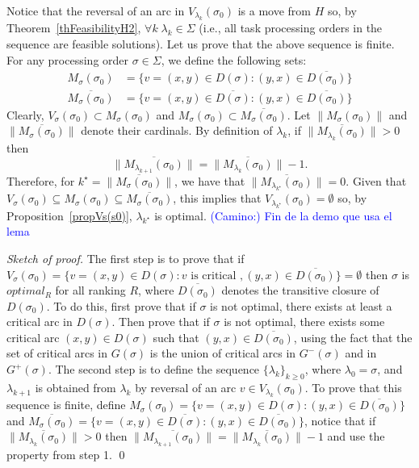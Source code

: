 \documentclass[preprint]{elsarticle}
\newcommand{\textcam}[1]{\textcolor{blue}{(Camino:) #1}}
\begin{document}
Notice that the reversal of an arc in $V_{\lambda_k}(\sigma_0)$ is a move from $H$ so, by Theorem~\ref{thFeasibilityH2}, $\forall k \; \lambda_k \in \Sigma$ (i.e., all task processing orders in the sequence are feasible solutions). Let us prove that the above sequence is finite. For any processing order $\sigma \in \Sigma$, we define the following sets:
\begin{align*}
M_{\sigma}(\sigma_0) & = \{v=(x,y) \in D(\sigma) : (y,x) \in \overline{D(\sigma_0)} \}\\
\overline{M_{\sigma}(\sigma_0)} & = \{v=(x,y) \in \overline{D(\sigma)} : (y,x) \in \overline{D(\sigma_0)} \}
\end{align*}
Clearly, $V_\sigma(\sigma_0) \subset M_\sigma(\sigma_0)$ and $M_\sigma(\sigma_0) \subset \overline{M_\sigma(\sigma_0)}$. Let $\|M_\sigma(\sigma_0)\|$ and $\|\overline{M_\sigma(\sigma_0)}\|$ denote their cardinals.
By definition of $\lambda_k$, if $\|\overline{M_{\lambda_k}(\sigma_0)}\| > 0$ then
\begin{equation*}
\|\overline{M_{\lambda_{k+1}}(\sigma_0)}\| = \|\overline{M_{\lambda_k}(\sigma_0)}\| -1.
\end{equation*}
Therefore, for $k^\star = \|\overline{M_\sigma(\sigma_0)}\|$, we have that $\|\overline{M_{\lambda_{k^\star}}(\sigma_0)}\| = 0$. Given that $V_\sigma(\sigma_0) \subseteq M_\sigma(\sigma_0) \subseteq \overline{M_\sigma(\sigma_0)}$, this implies that $V_{\lambda_{k^\star}}(\sigma_0) = \emptyset$ so, by Proposition~\ref{propVs(s0)}, $\lambda_{k^\star}$ is optimal.
\textcam{Fin de la demo que usa el lema}

\emph{Sketch of proof.} The first step is to prove that if $V_\sigma(\sigma_0) = \{v=(x,y) \in D(\sigma) : v \text{ is critical }, (y,x) \in \overline{D(\sigma_0)} \} = \emptyset$ then $\sigma$ is $optimal_R$ for all ranking $R$, where $\overline{D(\sigma_0)}$ denotes the transitive closure of $D(\sigma_0)$. To do this, first prove that if $\sigma$ is not optimal, there exists at least a critical arc in $D(\sigma)$. Then prove that if $\sigma$ is not optimal, there exists some critical arc $(x,y) \in D(\sigma)$ such that $(y,x) \in \overline{D(\sigma_0)}$, using the fact that the set of critical arcs in $G(\sigma)$ is the union of critical arcs in $G^-(\sigma)$ and in $G^+(\sigma)$. The second step is to define the sequence $\{\lambda_k\}_{k \geq 0}$, where $\lambda_0 = \sigma$, and $\lambda_{k+1}$ is obtained from $\lambda_k$ by reversal of an arc $v \in V_{\lambda_k}(\sigma_0)$. To prove that this sequence is finite, define $M_{\sigma}(\sigma_0) = \{v=(x,y) \in D(\sigma) : (y,x) \in \overline{D(\sigma_0)} \}$ and $\overline{M_{\sigma}(\sigma_0)} = \{v=(x,y) \in \overline{D(\sigma)} : (y,x) \in \overline{D(\sigma_0)} \}$, notice that if $\|\overline{M_{\lambda_k}(\sigma_0)}\| > 0$ then $\|\overline{M_{\lambda_{k+1}}(\sigma_0)}\| = \|\overline{M_{\lambda_k}(\sigma_0)}\| -1$ and use the property from step 1. \qed
\end{document}
